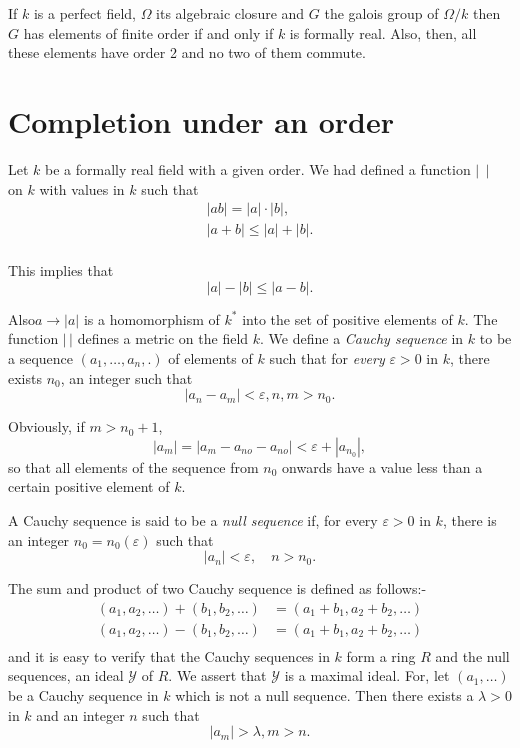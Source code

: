 \begin{thm}%
If $k$ is a perfect field, $ \Omega $ its algebraic closure and
   $G$ the galois group of $ \Omega/k $ then $G$ has elements of
   finite order if and only if  $k$ is formally real. Also, then, all
   these elements have order  2 and no two of them commute. 
\end{thm}

\section{Completion under an order}\label{c7:s4}%

 Let  $k$ be a formally real field with a given  order. We had defined
 a function $ \mid \, \mid $ on  $k$ with values in  $k$ such that  
 \begin{gather*}
| ab | =  | a | \cdot | b |, \\
| a + b | \leq | a | + | b | .\\
 \end{gather*} 
 
 This implies that 
 $$
 |a | - |b |\leq  | a - b | .
 $$
 
 Also\pageoriginale $a \rightarrow |a|$  is a homomorphism of $k^*$ into
 the set of positive elements of  $k$. The function $ |\, | $
 defines a metric on the field  $k$. We define a \textit{Cauchy
   sequence} in  $k$ to be a sequence   $ ( a_1, \ldots , a_n , .) $
 of elements of  $k$ such that for \textit{every} $ \varepsilon > 0 $
 in  $k$, there exists $n_0$, an integer  such that  
 $$
 \mid a_n -a_m \mid < \varepsilon , n, m > n_0 .
 $$
 
Obviously, if $m>n_0+1$,
$$
|a_m|=|a_m-a_{no}-a_{no}|<\varepsilon +|a_{n_0}|,
$$
so that all elements of the sequence from $n_0$ onwards have a value
less than a certain positive element of  $k$.  

A Cauchy sequence is  said to be a \textit{null sequence} if, for
every $ \varepsilon > 0 $ in  $k$, there is an integer $ n_0 = n_0
(\varepsilon) $ such that  
$$
\mid a_n \mid <  \varepsilon ,  \quad  n > n_0 .
$$

The sum and product of two Cauchy sequence is defined as follows:-
\begin{align*}
( a_1, a_2 , \ldots ) + ( b_1, b_2 , \ldots )  &= ( a_1 + b_1, a_2
  +b_2 , \ldots ) \\ 
( a_1, a_2 , \ldots ) - ( b_1, b_2 , \ldots )  &= ( a_1 + b_1, a_2
  +b_2 , \ldots )\\ 
\end{align*}
\noindent
and it is easy to verify that the Cauchy sequences in $k$  form a ring
$R$  and the null sequences, an ideal $\mathscr{Y}$ of $R$. We
assert that  $ \mathscr{Y} $ is a maximal ideal. For, let $ ( a_1 ,
\ldots ) $ be a Cauchy sequence in  $k$ which is not a null
sequence. Then there exists  a $ \lambda > 0 $  in  $k$ and an
integer $n$  such that  
\begin{equation*}
\mid a_m  \mid >  \lambda ,  m > n .  \tag{1}\label{chap7:eq1}
\end{equation*}


